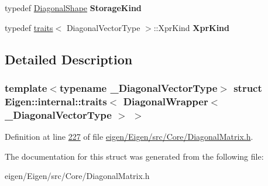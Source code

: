 \begin{DoxyCompactItemize}
\mbox{\label{struct_eigen_1_1internal_1_1traits_3_01_diagonal_wrapper_3_01___diagonal_vector_type_01_4_01_4_a0a13f32c0baa568450ae10e731bd0bbf}} 
typedef \hyperlink{struct_eigen_1_1_diagonal_shape}{Diagonal\+Shape} {\bfseries Storage\+Kind}
\item 
\mbox{\label{struct_eigen_1_1internal_1_1traits_3_01_diagonal_wrapper_3_01___diagonal_vector_type_01_4_01_4_ae95c2f4b8be356abdbd30d9c582a98fa}} 
typedef \hyperlink{struct_eigen_1_1internal_1_1traits}{traits}$<$ Diagonal\+Vector\+Type $>$\+::Xpr\+Kind {\bfseries Xpr\+Kind}
\end{DoxyCompactItemize}


\subsection{Detailed Description}
\subsubsection*{template$<$typename \+\_\+\+Diagonal\+Vector\+Type$>$\newline
struct Eigen\+::internal\+::traits$<$ Diagonal\+Wrapper$<$ \+\_\+\+Diagonal\+Vector\+Type $>$ $>$}



Definition at line \hyperlink{eigen_2_eigen_2src_2_core_2_diagonal_matrix_8h_source_l00227}{227} of file \hyperlink{eigen_2_eigen_2src_2_core_2_diagonal_matrix_8h_source}{eigen/\+Eigen/src/\+Core/\+Diagonal\+Matrix.\+h}.



The documentation for this struct was generated from the following file\+:\begin{DoxyCompactItemize}
\item 
eigen/\+Eigen/src/\+Core/\+Diagonal\+Matrix.\+h\end{DoxyCompactItemize}

